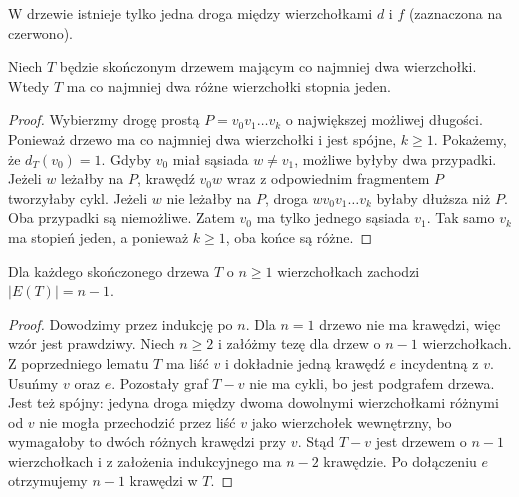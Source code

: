 \begin{center}

{\footnotesize W drzewie istnieje tylko jedna droga między
wierzchołkami $d$ i $f$ (zaznaczona na czerwono).}
\end{center}

\begin{lemat}
Niech $T$ będzie skończonym drzewem mającym
co najmniej dwa wierzchołki. Wtedy $T$ ma
co najmniej dwa różne wierzchołki stopnia jeden.
\end{lemat}

\begin{proof}
Wybierzmy drogę prostą $P=v_0v_1\ldots v_k$
o największej możliwej długości. Ponieważ drzewo
ma co najmniej dwa wierzchołki i jest spójne,
$k\ge1$. Pokażemy, że $d_T(v_0)=1$.
Gdyby $v_0$ miał sąsiada $w\ne v_1$, możliwe
byłyby dwa przypadki. Jeżeli $w$ leżałby na
$P$, krawędź $v_0w$ wraz z odpowiednim fragmentem
$P$ tworzyłaby cykl. Jeżeli $w$ nie leżałby
na $P$, droga $wv_0v_1\ldots v_k$ byłaby
dłuższa niż $P$. Oba przypadki są niemożliwe.
Zatem $v_0$ ma tylko jednego sąsiada $v_1$.
Tak samo $v_k$ ma stopień jeden, a ponieważ
$k\ge1$, oba końce są różne.
\end{proof}

\begin{twierdzenie}
Dla każdego skończonego drzewa $T$ o $n\ge1$
wierzchołkach zachodzi $|E(T)|=n-1$.
\end{twierdzenie}

\begin{proof}
Dowodzimy przez indukcję po $n$. Dla $n=1$
drzewo nie ma krawędzi, więc wzór jest prawdziwy.
Niech $n\ge2$ i załóżmy tezę dla drzew o $n-1$
wierzchołkach. Z poprzedniego lematu $T$ ma
liść $v$ i dokładnie jedną krawędź $e$ incydentną
z $v$. Usuńmy $v$ oraz $e$. Pozostały graf $T-v$
nie ma cykli, bo jest podgrafem drzewa. Jest
też spójny: jedyna droga między dwoma dowolnymi
wierzchołkami różnymi od $v$ nie mogła przechodzić
przez liść $v$ jako wierzchołek wewnętrzny, bo
wymagałoby to dwóch różnych krawędzi przy $v$.
Stąd $T-v$ jest drzewem o $n-1$ wierzchołkach
i z założenia indukcyjnego ma $n-2$ krawędzie.
Po dołączeniu $e$ otrzymujemy $n-1$ krawędzi w $T$.
\end{proof}

